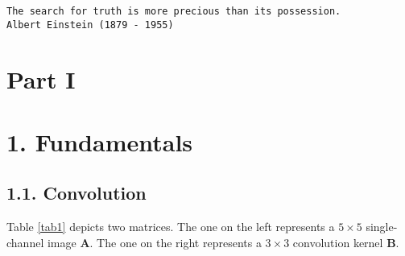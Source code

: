 \documentclass[12pt,letterpaper]{article}
\newcommand{\matr}[1]{\bm{#1}}     %
\begin{document}
\begin{center}
\texttt{The search for truth is more precious than its possession.\\  Albert Einstein (1879 - 1955)}
\end{center}
\section*{\centering Part I}

\section*{1. Fundamentals}
\subsection*{1.1. Convolution}
Table \ref{tab1} depicts two matrices. The one on the left represents a $5\times 5$ single-channel image $\matr{A}$. The one on the right
 represents a $3\times 3$ convolution kernel $\matr{B}$. 
\end{document}
